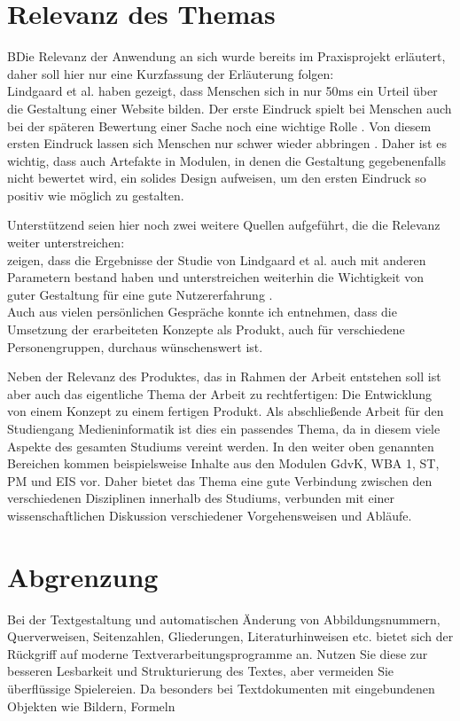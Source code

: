 \section{Relevanz des Themas}
\label{sec:relevance}
BDie Relevanz der Anwendung an sich wurde bereits im Praxisprojekt erläutert, daher soll hier nur eine Kurzfassung der Erläuterung folgen:\\
Lindgaard et al. \cite{lindgaard2006attention} haben gezeigt, dass Menschen sich in nur 50ms ein Urteil über die Gestaltung einer Website bilden. Der erste Eindruck spielt bei Menschen auch bei der späteren Bewertung einer Sache noch eine wichtige Rolle \cite{campbell1996fitting}. Von diesem ersten Eindruck lassen sich Menschen nur schwer wieder abbringen \cite{nickerson1998confirmation}.
Daher ist es wichtig, dass auch Artefakte in Modulen, in denen die Gestaltung gegebenenfalls nicht bewertet wird, ein solides Design aufweisen, um den ersten Eindruck so positiv wie möglich zu gestalten.

Unterstützend seien hier noch zwei weitere Quellen aufgeführt, die die Relevanz weiter unterstreichen:\\
\cite{tractinsky2006evaluating} zeigen, dass die Ergebnisse der Studie von Lindgaard et al. auch mit anderen Parametern bestand haben und unterstreichen weiterhin die Wichtigkeit von guter Gestaltung für eine gute Nutzererfahrung \cite{tractinsky2000beautiful}.\\
Auch aus vielen persönlichen Gespräche konnte ich entnehmen, dass die Umsetzung der erarbeiteten Konzepte als Produkt, auch für verschiedene Personengruppen, durchaus wünschenswert ist.

Neben der Relevanz des Produktes, das in Rahmen der Arbeit entstehen soll ist aber auch das eigentliche Thema der Arbeit zu rechtfertigen: Die Entwicklung von einem Konzept zu einem fertigen Produkt.
Als abschließende Arbeit für den Studiengang Medieninformatik ist dies ein passendes Thema, da in diesem viele Aspekte des gesamten Studiums vereint werden. In den weiter oben genannten Bereichen kommen beispielsweise Inhalte aus den Modulen GdvK, WBA 1, ST,  PM und EIS vor. Daher bietet das Thema eine gute Verbindung zwischen den verschiedenen Disziplinen innerhalb des Studiums, verbunden mit einer wissenschaftlichen Diskussion verschiedener Vorgehensweisen und Abläufe.

\section{Abgrenzung}
Bei der Textgestaltung und automatischen Änderung von Abbildungsnummern, Querverweisen,
Seitenzahlen, Gliederungen, Literaturhinweisen etc. bietet sich der Rückgriff
auf moderne Textverarbeitungsprogramme an. Nutzen Sie diese zur besseren Lesbarkeit
und Strukturierung des Textes, aber vermeiden Sie überflüssige Spielereien. Da
besonders bei Textdokumenten mit eingebundenen Objekten wie Bildern, Formeln

